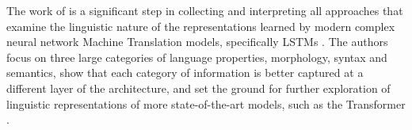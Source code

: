 The work of \citet{belinkov2020linguistic} is a significant step in collecting and interpreting all approaches that examine the linguistic nature of the representations learned by modern complex neural network Machine Translation models, specifically LSTMs \citep{bahdanau2014neural}. The authors focus on three large categories of language properties, morphology, syntax and semantics, show that each category of information is better captured at a different layer of the architecture, and set the ground for further exploration of linguistic representations of more state-of-the-art models, such as the Transformer \citep{vaswani2017attention}.